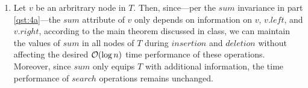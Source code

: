 \documentclass{article}
\begin{document}
\begin{enumerate}[leftmargin={*}, font={\bf}, label={\arabic*.}, ref={\arabic*}]
\begin{enumerate}[ref={(\alph*)}]
      \item \label{qst:4c}
        Let $v$ be an arbritrary node in $T$. Then, since---per the $sum$ invariance in part
        \ref{qst:4a}---the $sum$ attribute of $v$ only depends on information on $v$, $v.left$, and
        $v.right$, according to the main theorem discussed in class, we can maintain the values of
        $sum$ in all nodes of $T$ during $insertion$ and $deletion$ without affecting the desired
        $\operatorname*{\mathcal{O}}(\log n)$ time performance of these operations. Moreover, since $sum$ only equips $T$
        with additional information, the time performance of $search$ operations remains unchanged.
    \end{enumerate}
\end{enumerate}
\end{document}
